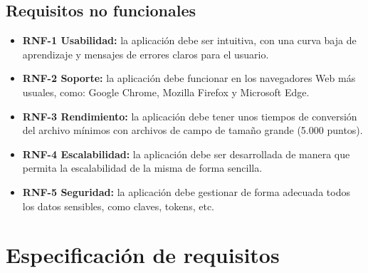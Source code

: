 \subsection{Requisitos no funcionales}

\begin{itemize}
\item \textbf{RNF-1 Usabilidad: }la aplicación debe ser intuitiva, con una curva baja de aprendizaje y mensajes de errores claros para el usuario.

\item \textbf{RNF-2 Soporte: }la aplicación debe funcionar en los navegadores Web más usuales, como: Google Chrome, Mozilla Firefox y Microsoft Edge.

\item \textbf{RNF-3 Rendimiento: }la aplicación debe tener unos tiempos de conversión del archivo mínimos con archivos de campo de tamaño grande (5.000 puntos).

\item \textbf{RNF-4 Escalabilidad: }la aplicación debe ser desarrollada de manera que permita la escalabilidad de la misma de forma sencilla.

\item \textbf{RNF-5 Seguridad:} la aplicación debe gestionar de forma adecuada todos los datos sensibles, como claves, tokens, etc.

\end{itemize}

\section{Especificación de requisitos}


